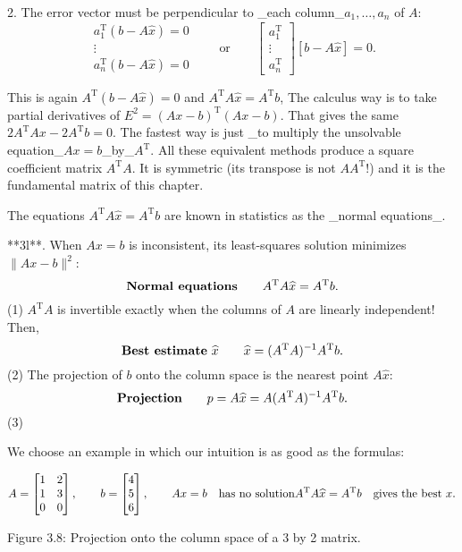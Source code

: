 2. The error vector must be perpendicular to _each column_\(a_{1},\ldots,a_{n}\) of \(A\): \[\begin{array}{c}a_{1}^{\mathrm{T}}(b-A\widehat{x})=0\\ \vdots\\ a_{n}^{\mathrm{T}}(b-A\widehat{x})=0\end{array}\qquad\text{or}\qquad\left[ \begin{array}{c}a_{1}^{\mathrm{T}}\\ \vdots\\ a_{n}^{\mathrm{T}}\end{array}\right]\left[b-A\widehat{x}\right]=0.\]

This is again \(A^{\mathrm{T}}(b-A\widehat{x})=0\) and \(A^{\mathrm{T}}A\widehat{x}=A^{\mathrm{T}}b\), The calculus way is to take partial derivatives of \(E^{2}=(Ax-b)^{\mathrm{T}}(Ax-b)\). That gives the same \(2A^{\mathrm{T}}Ax-2A^{\mathrm{T}}b=0\). The fastest way is just _to multiply the unsolvable equation_\(Ax=b\)_by_\(A^{\mathrm{T}}\). All these equivalent methods produce a square coefficient matrix \(A^{\mathrm{T}}A\). It is symmetric (its transpose is not \(AA^{\mathrm{T}}\)!) and it is the fundamental matrix of this chapter.

The equations \(A^{\mathrm{T}}A\widehat{x}=A^{\mathrm{T}}b\) are known in statistics as the _normal equations_.

**3l**. When \(Ax=b\) is inconsistent, its least-squares solution minimizes \(\|Ax-b\|^{2}\): \[\text{\bf Normal equations}\qquad A^{\mathrm{T}}A\widehat{x}=A^{\mathrm{T}}b.\] (1) \(A^{\mathrm{T}}A\) is invertible exactly when the columns of \(A\) are linearly independent! Then, \[\text{\bf Best estimate}\ \widehat{x}\qquad\widehat{x}=(A^{\mathrm{T}}A)^{-1}A^{ \mathrm{T}}b.\] (2) The projection of \(b\) onto the column space is the nearest point \(A\widehat{x}\): \[\text{\bf Projection}\qquad p=A\widehat{x}=A(A^{\mathrm{T}}A)^{-1}A^{ \mathrm{T}}b.\] (3)

We choose an example in which our intuition is as good as the formulas:

\[A=\begin{bmatrix}1&2\\ 1&3\\ 0&0\end{bmatrix},\qquad b=\begin{bmatrix}4\\ 5\\ 6\end{bmatrix},\qquad Ax=b\quad\text{has no solution}\\ A^{\mathrm{T}}A\widehat{x}=A^{\mathrm{T}}b\quad\text{gives the best $x$.}\]

Figure 3.8: Projection onto the column space of a 3 by 2 matrix.

 
